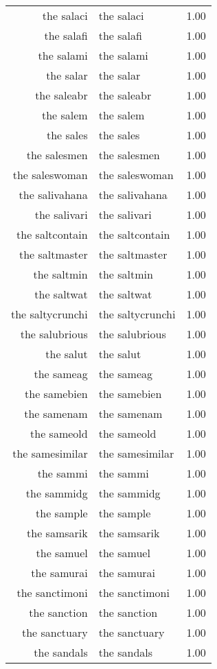 \begin{table}[ht]
\begin{tabular}{rlr}
  the salaci & the salaci & 1.00 \\ 
  the salafi & the salafi & 1.00 \\ 
  the salami & the salami & 1.00 \\ 
  the salar & the salar & 1.00 \\ 
  the saleabr & the saleabr & 1.00 \\ 
  the salem & the salem & 1.00 \\ 
  the sales & the sales & 1.00 \\ 
  the salesmen & the salesmen & 1.00 \\ 
  the saleswoman & the saleswoman & 1.00 \\ 
  the salivahana & the salivahana & 1.00 \\ 
  the salivari & the salivari & 1.00 \\ 
  the saltcontain & the saltcontain & 1.00 \\ 
  the saltmaster & the saltmaster & 1.00 \\ 
  the saltmin & the saltmin & 1.00 \\ 
  the saltwat & the saltwat & 1.00 \\ 
  the saltycrunchi & the saltycrunchi & 1.00 \\ 
  the salubrious & the salubrious & 1.00 \\ 
  the salut & the salut & 1.00 \\ 
  the sameag & the sameag & 1.00 \\ 
  the samebien & the samebien & 1.00 \\ 
  the samenam & the samenam & 1.00 \\ 
  the sameold & the sameold & 1.00 \\ 
  the samesimilar & the samesimilar & 1.00 \\ 
  the sammi & the sammi & 1.00 \\ 
  the sammidg & the sammidg & 1.00 \\ 
  the sample & the sample & 1.00 \\ 
  the samsarik & the samsarik & 1.00 \\ 
  the samuel & the samuel & 1.00 \\ 
  the samurai & the samurai & 1.00 \\ 
  the sanctimoni & the sanctimoni & 1.00 \\ 
  the sanction & the sanction & 1.00 \\ 
  the sanctuary & the sanctuary & 1.00 \\ 
  the sandals & the sandals & 1.00 \\ 

\end{tabular}
\end{table}
